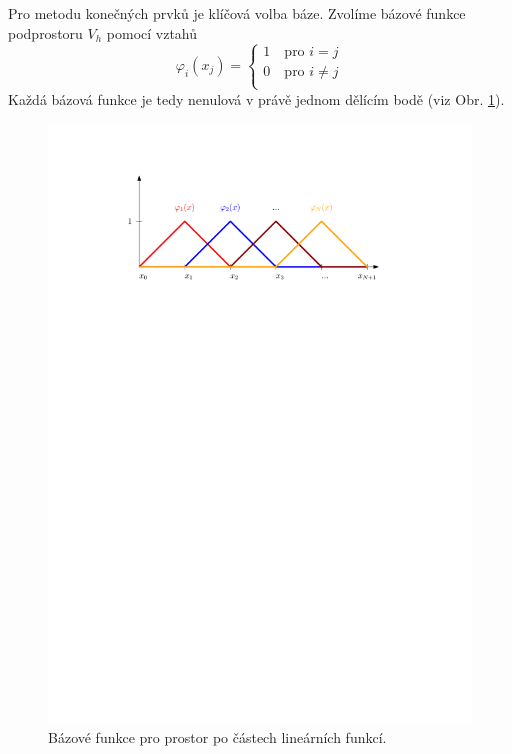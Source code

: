 Pro metodu konečných prvků je klíčová volba báze.
Zvolíme bázové funkce podprostoru $V_h$ pomocí vztahů
\begin{equation*}
      \varphi_i(x_j) = 
        \begin{cases}
          1 \quad \textrm{pro } i=j\\
          0 \quad \textrm{pro } i\neq j\\
        \end{cases}
\end{equation*}
Každá bázová funkce je tedy nenulová v právě jednom dělícím bodě (viz Obr. \ref{fig:base_1d_lin}).
\begin{figure}[h]
\centering
\includegraphics{base_1d_lin}
\caption{Bázové funkce pro prostor po částech lineárních funkcí.}
\label{fig:base_1d_lin}
\end{figure}

